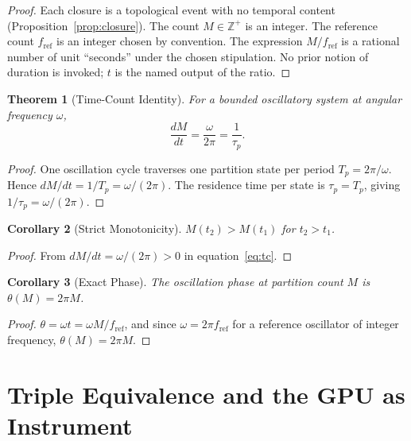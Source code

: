 \documentclass[twocolumn,10pt,a4paper]{article}
\theoremstyle{thmstyle}
\newtheorem{theorem}{Theorem}[section]
\newtheorem{corollary}[theorem]{Corollary}
\theoremstyle{definition}
\theoremstyle{remark}
\newcommand{\Zp}{\mathbb{Z}^{+}}
\newcommand{\taup}{\tau_{p}}
\begin{document}
\begin{proof}
Each closure is a topological event with no temporal content
(Proposition~\ref{prop:closure}). The count $M\in\Zp$ is an integer.
The reference count $f_{\mathrm{ref}}$ is an integer chosen by
convention. The expression $M/f_{\mathrm{ref}}$ is a rational number
of unit ``seconds'' under the chosen stipulation. No prior notion of
duration is invoked; $t$ is the named output of the ratio.
\end{proof}

\begin{theorem}[Time-Count Identity]
\label{thm:tc}
For a bounded oscillatory system at angular frequency $\omega$,
\begin{equation}
\boxed{\;\frac{dM}{dt}=\frac{\omega}{2\pi}=\frac{1}{\taup}.\;}
\label{eq:tc}
\end{equation}
\end{theorem}

\begin{proof}
One oscillation cycle traverses one partition state per period
$T_{p}=2\pi/\omega$. Hence $dM/dt=1/T_{p}=\omega/(2\pi)$. The
residence time per state is $\taup=T_{p}$, giving $1/\taup=\omega/(2\pi)$.
\end{proof}

\begin{corollary}[Strict Monotonicity]
\label{cor:mono}
$M(t_{2})>M(t_{1})$ for $t_{2}>t_{1}$.
\end{corollary}

\begin{proof}
From $dM/dt=\omega/(2\pi)>0$ in equation~\eqref{eq:tc}.
\end{proof}

\begin{corollary}[Exact Phase]
\label{cor:phase}
The oscillation phase at partition count $M$ is
$\theta(M)=2\pi M$.
\end{corollary}

\begin{proof}
$\theta=\omega t=\omega M/f_{\mathrm{ref}}$, and since
$\omega=2\pi f_{\mathrm{ref}}$ for a reference oscillator of integer
frequency, $\theta(M)=2\pi M$.
\end{proof}

\section{Triple Equivalence and the GPU as Instrument}
\label{sec:triple}
\end{document}
